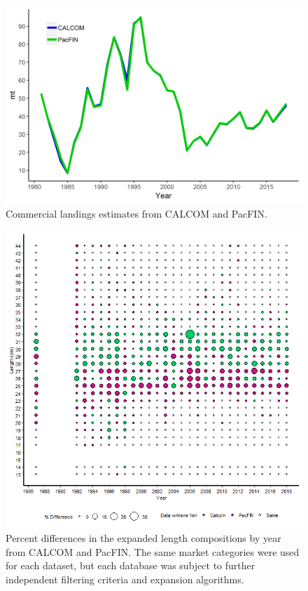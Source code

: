 \documentclass[12pt,]{article}
\begin{document}
\begin{figure}
\centering
\includegraphics{Figures/Calcom_vs_Pacfin.png}
\caption{Commercial landings estimates from CALCOM and PacFIN.
\label{fig:Calcom_vs_Pacfin}}
\end{figure}

\begin{figure}
\centering
\includegraphics{Figures/Calcom_vs_pacfin_lengths.png}
\caption{Percent differences in the expanded length compositions by year
from CALCOM and PacFIN. The same market categories were used for each
dataset, but each database was subject to further independent filtering
criteria and expansion algorithms. \label{fig:Calcom_vs_pacfin_lengths}}
\end{figure}
\end{document}
